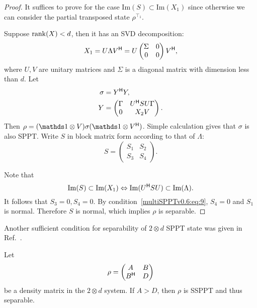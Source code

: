   \begin{proof}
    It suffices to prove  for the case $\mathrm{Im}(S)\subset\mathrm{Im}(X_1)$ since otherwise we can consider the
    partial transposed state $\rho^{\intercal_1}$.

   Suppose $\mathrm{rank} (X)< d$, then it has an SVD decomposition:
    \begin{equation}
      \label{eq:50}
      X_1 =  U \Lambda V^{\mathsf{H}}=
      U
      \begin{pmatrix}
        \Sigma&0\\
        0&0
      \end{pmatrix}
      V^{\mathsf{H}} ,
    \end{equation}
    where $U,V$ are unitary matrices and $\Sigma $ is a diagonal matrix with dimension less than $d$.
    Let
    \begin{equation}
      \label{multiSPPTv0.6:eq:10}
      \begin{split}
        \sigma &= Y^{\mathsf{H}} Y,\\
        Y &=
        \begin{pmatrix}
          \Gamma & U^{\mathsf{H}} S U \Gamma\\
          0 & X_2 V 
        \end{pmatrix}.
        \end{split}
      \end{equation}
      Then $\rho = (\I \otimes V)\sigma (\I \otimes \adj V)$. Simple calculation gives that $\sigma$ is also SPPT.\@
     Write $S$ in block matrix form according to that of  $\Lambda$:
    \begin{equation}
      \label{eq:52}
      S =
      \begin{pmatrix}
        S_1&S_2\\
        S_3&S_4
      \end{pmatrix}.
    \end{equation}
    
    Note that
    \[\mathrm{Im}(S)\subset \mathrm{Im}(X_1) \Leftrightarrow\mathrm{Im}(U^{\mathsf{H}}S U)\subset
      \mathrm{Im}(\Lambda).\]
    It  follows that
    $S_3=0,S_4=0$. By   condition~\eqref{multiSPPTv0.6:eq:9}, $S_4=0$ and
    $S_1$ is normal. Therefore $S$  is normal, which implies  $\rho$ is separable.
  \end{proof}
  Another sufficient condition for separability of $2\otimes d $ SPPT state was given in Ref.~\cite{Guo2012}.
  \begin{lem}%
  \label{AgreaterD}
    Let \begin{equation} \rho =
      \begin{pmatrix}
        A & B\\
        B^{\mathsf{H}} & D
      \end{pmatrix}
      \label{abd}
    \end{equation}
    be a density matrix in the $2\otimes d $ system.  If $A>D$, then $\rho$ is SSPPT and thus separable.
  \end{lem}
